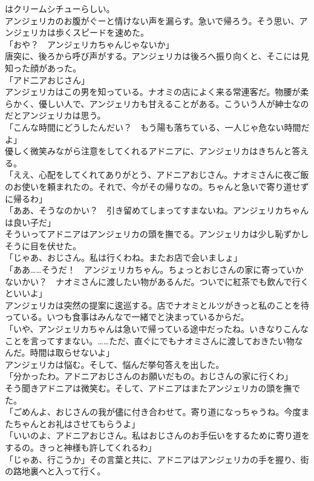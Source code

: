 \documentclass[b5j,10pt,openany]{jsbook}
\begin{document}
はクリームシチューらしい。\\アンジェリカのお腹がぐーと情けない声を漏らす。急いで帰ろう。そう思い、アンジェリカは歩くスピードを速めた。\\「おや？　アンジェリカちゃんじゃないか」\\唐突に、後ろから呼び声がする。アンジェリカは後ろへ振り向くと、そこには見知った顔があった。\\「アド二アおじさん」\\アンジェリカはこの男を知っている。ナオミの店によく来る常連客だ。物腰が柔らかく、優しい人で、アンジェリカも甘えることがある。こういう人が紳士なのだとアンジェリカは思う。\\「こんな時間にどうしたんだい？　もう陽も落ちている、一人じゃ危ない時間だよ」\\優しく微笑みながら注意をしてくれるアドニアに、アンジェリカはきちんと答える。\\「ええ、心配をしてくれてありがとう、アドニアおじさん。ナオミさんに夜ご飯のお使いを頼まれたの。それで、今がその帰りなの。ちゃんと急いで寄り道せずに帰るわ」\\「ああ、そうなのかい？　引き留めてしまってすまないね。アンジェリカちゃんは良い子だ」\\そういってアドニアはアンジェリカの頭を撫でる。アンジェリカは少し恥ずかしそうに目を伏せた。\\「じゃあ、おじさん。私は行くわね。またお店で会いましょ」\\「ああ\ldots{}\ldots{}そうだ！　アンジェリカちゃん。ちょっとおじさんの家に寄っていかないかい？　ナオミさんに渡したい物があるんだ。ついでに紅茶でも飲んで行くといいよ」\\アンジェリカは突然の提案に逡巡する。店でナオミとルツがきっと私のことを待っている。いつも食事はみんなで一緒でと決まっているからだ。\\「いや、アンジェリカちゃんは急いで帰っている途中だったね。いきなりこんなことを言ってすまない。\ldots{}\ldots{}ただ、直ぐにでもナオミさんに渡しておきたい物なんだ。時間は取らせないよ」\\アンジェリカは悩む。そして、悩んだ挙句答えを出した。\\「分かったわ。アドニアおじさんのお願いだもの。おじさんの家に行くわ」\\そう聞きアドニアは微笑む。そして、アドニアはまたアンジェリカの頭を撫でた。\\「ごめんよ、おじさんの我が儘に付き合わせて。寄り道になっちゃうね。今度またちゃんとお礼はさせてもらうよ」\\「いいのよ、アドニアおじさん。私はおじさんのお手伝いをするために寄り道をするの。きっと神様も許してくれるわ」\\「じゃあ、行こうか」その言葉と共に、アドニアはアンジェリカの手を握り、街の路地裏へと入って行く。
\end{document}
